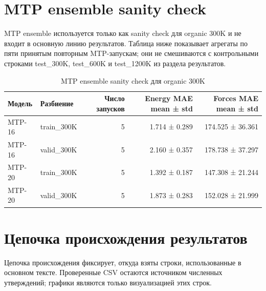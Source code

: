 \section{MTP ensemble sanity check}

MTP ensemble используется только как sanity check для organic 300K и не входит в основную линию результатов. Таблица ниже показывает агрегаты по пяти принятым повторным MTP-запускам; они не смешиваются с контрольными строками test\_300K, test\_600K и test\_1200K из раздела результатов.

\begin{table}[ht]
\centering
\scriptsize
\caption{MTP ensemble sanity check для organic 300K}
\label{tab:appendix_mtp_ensemble_sanity}
\begin{tabularx}{\textwidth}{@{}l l r r r@{}}
\toprule
Модель & Разбиение & Число запусков & Energy MAE mean ± std & Forces MAE mean ± std \\
\midrule
MTP-16 & train\_300K & 5 & 1.714 ± 0.289 & 174.525 ± 36.361 \\
MTP-16 & valid\_300K & 5 & 2.160 ± 0.357 & 178.738 ± 37.297 \\
MTP-20 & train\_300K & 5 & 1.392 ± 0.187 & 147.308 ± 21.244 \\
MTP-20 & valid\_300K & 5 & 1.873 ± 0.283 & 152.028 ± 21.999 \\
\bottomrule
\end{tabularx}
\end{table}

\section{Цепочка происхождения результатов}

Цепочка происхождения фиксирует, откуда взяты строки, использованные в основном тексте. Проверенные CSV остаются источником численных утверждений; графики являются только визуализацией этих строк.

